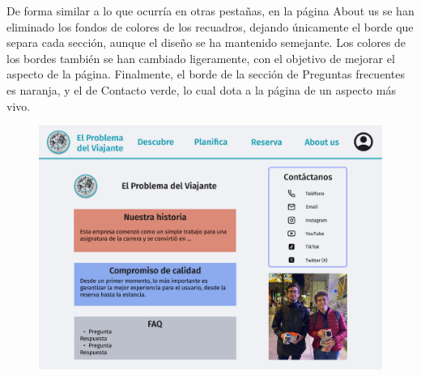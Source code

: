 \documentclass[11pt, a4paper]{book}
\begin{document}
	De forma similar a lo que ocurría en otras pestañas, en la página About us se han eliminado los fondos de colores de los recuadros, dejando únicamente el borde que separa cada sección, aunque el diseño se ha mantenido semejante. Los colores de los bordes también se han cambiado ligeramente, con el objetivo de mejorar el aspecto de la página. Finalmente, el borde de la sección de Preguntas frecuentes es naranja, y el de Contacto verde, lo cual dota a la página de un aspecto más vivo.
	
	\begin{figure} [H]
		\centering
		\begin{minipage}[c]{0.45\textwidth}
			\centering
			\includegraphics[width=\textwidth]{mockup-about_us.png}
		\end{minipage}
		\hspace{0.04\textwidth}
		\begin{minipage}[c]{0.45\textwidth}
			\centering

\end{minipage}
\end{figure}
\end{document}
